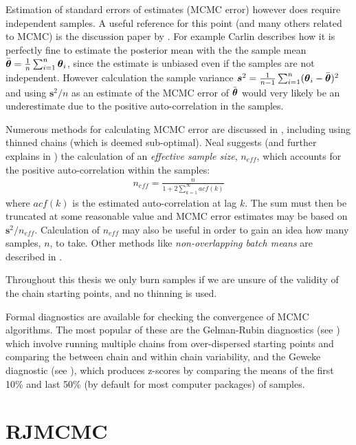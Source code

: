 Estimation of standard errors of estimates (\gls{MCMC} error) however does require independent samples. A useful
reference for this point (and many others related to \gls{MCMC}) is the discussion paper by \cite{kass1998}. For example
Carlin describes how it is perfectly fine to estimate the posterior mean with the the sample mean \(\bar{\boldsymbol{\theta}} =
\frac{1}{n} \sum_{i=1}^{n} \boldsymbol{\theta}_i\), since the estimate is unbiased even if the samples are not independent.
However calculation the sample variance \(\boldsymbol{s}^2 = \frac{1}{n-1} \sum_{i=1}^{n} (\boldsymbol{\theta}_i -
\bar{\boldsymbol{\theta}})^2 \) and using \(\boldsymbol{s}^2 / n\) as an estimate of the \gls{MCMC} error of \(\bar{\boldsymbol{\theta}}\)
would very likely be an underestimate due to the positive auto-correlation in the samples.

Numerous methods for calculating \gls{MCMC} error are discussed in \cite{kass1998}, including using thinned chains
(which is deemed sub-optimal). Neal suggests (and further explains in \cite{neal1993}) the calculation of an
\textit{effective sample size}, \(n_{eff}\), which accounts for the positive auto-correlation within the samples:
\begin{align} 
n_{eff} = \frac{n}{1 + 2 \sum_{k=1}^\infty acf(k)}
\end{align}
where \(acf(k)\) is the estimated auto-correlation at lag \(k\). The sum must then be truncated at some reasonable value
and \gls{MCMC} error estimates may be based on \(\boldsymbol{s}^2 / n_{eff}\). Calculation of \(n_{eff}\) may also be
useful in order to gain an idea how many samples, \(n\), to take. Other methods like \textit{non-overlapping batch
means} are described in \cite{geyer2011}.

Throughout this thesis we only burn samples if we are unsure of the validity of the chain starting points, and no
thinning is used.

Formal diagnostics are available for checking the convergence of \gls{MCMC} algorithms. The most popular of these are
the Gelman-Rubin diagnostics (see \cite{gelman1992, brooks1998}) which involve running multiple chains from
over-dispersed starting points and comparing the between chain and within chain variability, and the Geweke diagnostic
(see \cite{geweke1991}), which produces z-scores by comparing the means of the first 10\% and last 50\% (by default for
most computer packages) of samples.

\section{RJMCMC}
\label{sec:RJMCMC_overview}

